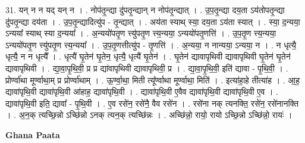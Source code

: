 \documentclass[17pt]{extarticle}
\begin{document}
31. यन् न न यद् यन् न । . नोप॑तृ॒न्द्या दु॑पतृ॒न्द्यान् न नोप॑तृ॒न्द्यात् । . उ॒प॒तृ॒न्द्या दय॒ता ऽय॑तोपतृ॒न्द्या दु॑पतृ॒न्द्या दय॑ता । . उ॒प॒तृ॒न्द्यादित्यु॑प - तृ॒न्द्यात् । . अय॑ता स्याथ् स्या॒ दय॒ता ऽय॑ता स्यात् । . स्या॒ द॒न्यया॒ ऽन्यया᳚ स्याथ् स्या द॒न्यया᳚ । . अ॒न्ययो॑पतृ॒ण त्त्यु॑पतृ॒ण त्त्य॒न्यया॒ ऽन्ययो॑पतृ॒णत्ति॑ । . उ॒प॒तृ॒ण त्त्य॒न्यया॒ ऽन्ययो॑पतृ॒ण त्त्यु॑पतृ॒ण त्त्य॒न्यया᳚ । . उ॒प॒तृ॒णत्तीत्यु॑प - तृ॒णत्ति॑ । . अ॒न्यया॒ न नान्यया॒ ऽन्यया॒ न । . न धृत्यै॒ धृत्यै॒ न न धृत्यै᳚ । . धृत्यै॑ घृ॒तेन॑ घृ॒तेन॒ धृत्यै॒ धृत्यै॑ घृ॒तेन॑ । . घृ॒तेन॑ द्यावापृथिवी द्यावापृथिवी घृ॒तेन॑ घृ॒तेन॑ द्यावापृथिवी । . द्या॒वा॒पृ॒थि॒वी॒ प्र प्र द्या॑वापृथिवी द्यावापृथिवी॒ प्र । . द्या॒वा॒पृ॒थि॒वी॒ इति॑ द्यावा - पृ॒थि॒वी॒ । . प्रोर्ण्वा॑था मूर्ण्वाथा॒म् प्र प्रोर्ण्वा॑थाम् । . ऊ॒र्ण्वा॒था॒ मिती त्यू᳚र्ण्वाथा मूर्ण्वाथा॒ मिति॑ । . इत्या॑हा॒हे तीत्या॑ह । . आ॒ह॒ द्यावा॑पृथि॒वी द्यावा॑पृथि॒वी आ॑हाह॒ द्यावा॑पृथि॒वी । . द्यावा॑पृथि॒वी ए॒वैव द्यावा॑पृथि॒वी द्यावा॑पृथि॒वी ए॒व । . द्यावा॑पृथि॒वी इति॒ द्यावा᳚ - पृ॒थि॒वी । . ए॒व रसे॑न॒ रसे॑नै॒ वैव रसे॑न । . रसे॑ना नक् त्यनक्ति॒ रसे॑न॒ रसे॑नानक्ति । . अ॒न॒क् त्यच्छि॒न्नो ऽच्छि॑न्नो ऽनक् त्यन॒क् त्यच्छि॑न्नः । . अच्छि॑न्नो॒ रायो॒ रायो ऽच्छि॒न्नो ऽच्छि॑न्नो॒ रायः॑ । \newline

\textbf{Ghana Paata } \newline
\end{document}
